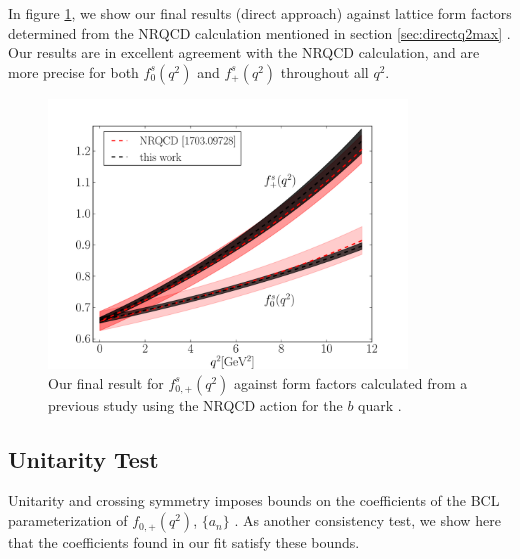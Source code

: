 In figure \ref{fig:nrqcd}, we show our final results (direct approach) against lattice form factors determined from the NRQCD calculation mentioned in section \ref{sec:directq2max} \cite{Monahan:2017uby}. Our results are in excellent agreement with the NRQCD calculation, and are more precise for both $f^s_0(q^2)$ and $f^s_+(q^2)$ throughout all $q^2$.

\begin{figure}[htb!]
\begin{center}
  \includegraphics[width=0.85\textwidth]{images/BsDs/nrqcd_comparison.pdf}
  \caption{ Our final result for $f_{0,+}^s(q^2)$ against form factors calculated from a previous study using the NRQCD action for the $b$ quark  \cite{Monahan:2017uby} .\label{fig:nrqcd}}
  \end{center}
\end{figure}

\subsection{Unitarity Test}

Unitarity and crossing symmetry imposes bounds on the coefficients of the BCL parameterization of $f_{0,+}(q^2)$, $\{a_n\}$ \cite{PhysRevD.4.725,PhysRevD.3.2807}. As another consistency test, we show here that the coefficients found in our fit satisfy these bounds.

